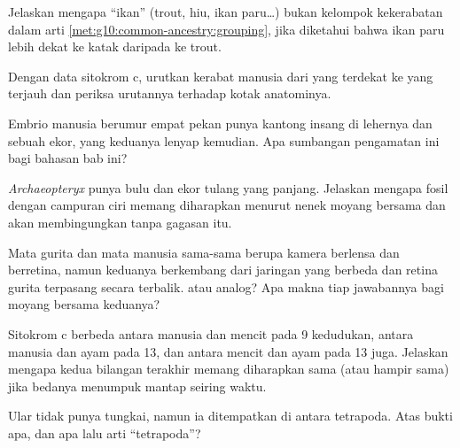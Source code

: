 \begin{exercise}[$\star\star$]\label{exo:g10:common-ancestry:8}
Jelaskan mengapa ``ikan'' (trout, hiu, ikan paru\dots) bukan kelompok
kekerabatan dalam arti \cref{met:g10:common-ancestry:grouping}, jika
diketahui bahwa ikan paru lebih dekat ke katak daripada ke trout.
\end{exercise}

\begin{exercise}[$\star\star$]\label{exo:g10:common-ancestry:9}
Dengan data sitokrom c, urutkan kerabat manusia dari yang terdekat ke
yang terjauh dan periksa urutannya terhadap kotak anatominya.
\end{exercise}

\begin{exercise}[$\star\star$]\label{exo:g10:common-ancestry:10}
Embrio manusia berumur empat pekan punya kantong insang di lehernya dan
sebuah ekor, yang keduanya lenyap kemudian. Apa sumbangan pengamatan
ini bagi bahasan bab ini?
\end{exercise}

\begin{exercise}[$\star\star$]\label{exo:g10:common-ancestry:11}
\emph{Archaeopteryx} punya bulu dan ekor tulang yang panjang. Jelaskan
mengapa fosil dengan campuran ciri memang diharapkan menurut nenek
moyang bersama dan akan membingungkan tanpa gagasan itu.
\end{exercise}

\begin{exercise}[$\star\star\star$]\label{exo:g10:common-ancestry:12}
Mata gurita dan mata manusia sama-sama berupa kamera berlensa dan
berretina, namun keduanya berkembang dari jaringan yang berbeda dan
retina gurita terpasang secara terbalik.  atau analog? Apa makna
tiap jawabannya bagi moyang bersama keduanya?
\end{exercise}

\begin{exercise}[$\star\star\star$]\label{exo:g10:common-ancestry:13}
Sitokrom c berbeda antara manusia dan mencit pada 9 kedudukan, antara
manusia dan ayam pada 13, dan antara mencit dan ayam pada 13 juga.
Jelaskan mengapa kedua bilangan terakhir memang diharapkan sama (atau
hampir sama) jika bedanya menumpuk mantap seiring waktu.
\end{exercise}

\begin{exercise}[$\star\star\star$]\label{exo:g10:common-ancestry:14}
Ular tidak punya tungkai, namun ia ditempatkan di antara tetrapoda.
Atas bukti apa, dan apa lalu arti ``tetrapoda''?
\end{exercise}

